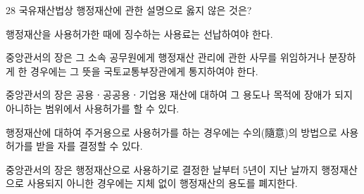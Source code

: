 \begin{question}{28}
국유재산법상 행정재산에 관한 설명으로 옳지 않은 것은?
\begin{choices}
  \item 행정재산을 사용허가한 때에 징수하는 사용료는 선납하여야 한다.
  \item 중앙관서의 장은 그 소속 공무원에게 행정재산 관리에 관한 사무를 위임하거나 분장하게 한 경우에는 그 뜻을 국토교통부장관에게 통지하여야 한다.
  \item 중앙관서의 장은 공용ㆍ공공용ㆍ기업용 재산에 대하여 그 용도나 목적에 장애가 되지 아니하는 범위에서 사용허가를 할 수 있다.
  \item 행정재산에 대하여 주거용으로 사용허가를 하는 경우에는 수의(隨意)의 방법으로 사용허가를 받을 자를 결정할 수 있다.
  \item 중앙관서의 장은 행정재산으로 사용하기로 결정한 날부터 5년이 지난 날까지 행정재산으로 사용되지 아니한 경우에는 지체 없이 행정재산의 용도를 폐지한다.
\end{choices}
\end{question}
